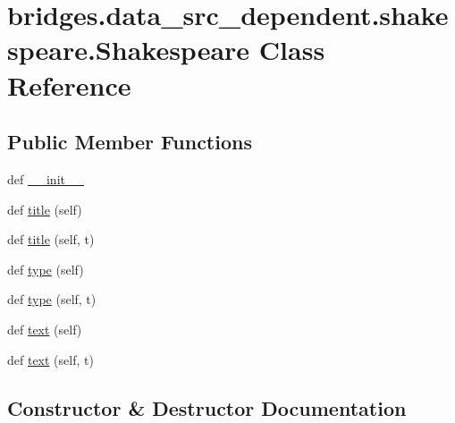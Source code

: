 \hypertarget{classbridges_1_1data__src__dependent_1_1shakespeare_1_1_shakespeare}{}\section{bridges.\+data\+\_\+src\+\_\+dependent.\+shakespeare.\+Shakespeare Class Reference}
\label{classbridges_1_1data__src__dependent_1_1shakespeare_1_1_shakespeare}
\subsection*{Public Member Functions}
\begin{DoxyCompactItemize}
\item 
def \mbox{\hyperlink{classbridges_1_1data__src__dependent_1_1shakespeare_1_1_shakespeare_a22b3c0d1bcce2f1c7f7845b9db8a8610}{\+\_\+\+\_\+init\+\_\+\+\_\+}}
\item 
def \mbox{\hyperlink{classbridges_1_1data__src__dependent_1_1shakespeare_1_1_shakespeare_a3bd228852c9e0fc4653ada17f1803c15}{title}} (self)
\item 
def \mbox{\hyperlink{classbridges_1_1data__src__dependent_1_1shakespeare_1_1_shakespeare_abbf3b79e27e5e4afc1040a340dbf4d49}{title}} (self, t)
\item 
def \mbox{\hyperlink{classbridges_1_1data__src__dependent_1_1shakespeare_1_1_shakespeare_ae2499dd686160849220edc662246e42a}{type}} (self)
\item 
def \mbox{\hyperlink{classbridges_1_1data__src__dependent_1_1shakespeare_1_1_shakespeare_a9b4489402fda80ec8360bb17ad3d0af9}{type}} (self, t)
\item 
def \mbox{\hyperlink{classbridges_1_1data__src__dependent_1_1shakespeare_1_1_shakespeare_a588e767fe0f474440f2b9a1fda8ede96}{text}} (self)
\item 
def \mbox{\hyperlink{classbridges_1_1data__src__dependent_1_1shakespeare_1_1_shakespeare_af81f61dc7578547f5ed42792fc36e37a}{text}} (self, t)
\end{DoxyCompactItemize}


\subsection{Constructor \& Destructor Documentation}
\mbox{\label{classbridges_1_1data__src__dependent_1_1shakespeare_1_1_shakespeare_a22b3c0d1bcce2f1c7f7845b9db8a8610}} 
